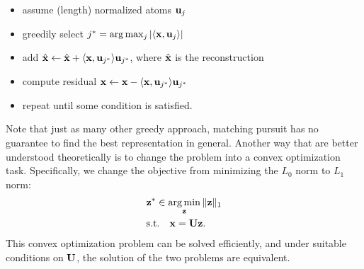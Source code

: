 \documentclass[../main.tex]{subfiles}
\begin{document}
\begin{itemize}
	\item assume (length) normalized atoms ${\bf u}_j$
	\item greedily select $j^*=\arg\max_j|\langle {\bf x},{\bf u}_j\rangle|$
	\item add $\hat{\bf x}\leftarrow \hat{\bf x} + \langle {\bf x},{\bf u}_{j^*}\rangle {\bf u}_{j^*}$, where $\hat{\bf x}$ is the reconstruction
	\item compute residual ${\bf x}\leftarrow {\bf x} - \langle {\bf x},{\bf u}_{j^*}\rangle {\bf u}_{j^*}$
	\item repeat until some condition is satisfied.
\end{itemize}
Note that just as many other greedy approach, matching pursuit has no guarantee to find the best representation in general. Another way that are better understood theoretically is to change the problem into a convex optimization task. Specifically, we change the objective from minimizing the $L_0$ norm to $L_1$ norm:
\begin{align}
\label{eq_9_L1}&{\bf z}^*\in\mathop{\arg\min}_{\bf z}\|{\bf z}\|_1\\
&{\rm s.t.}\quad {\bf x}={\bf Uz}.\notag
\end{align}
This convex optimization problem can be solved efficiently, and under suitable conditions on ${\bf U}$, the solution of the two problems are equivalent.
\end{document}
